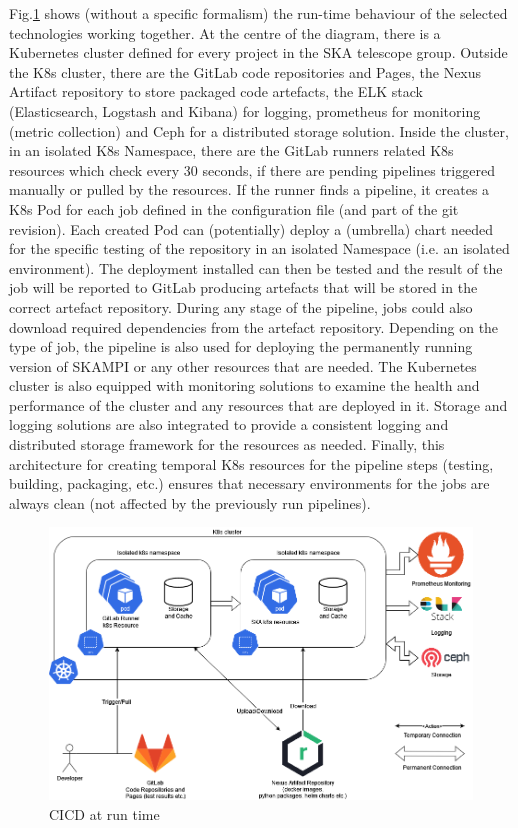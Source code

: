 \documentclass[a4paper,
               keeplastbox,   %
               ]{jacow}
\begin{document}
Fig.\ref{fig:cicdruntime} shows (without a specific formalism) the run-time behaviour of the selected technologies working together. At the centre of the diagram, there is a Kubernetes cluster defined for every project in the SKA telescope group. Outside the K8s cluster, there are the GitLab code repositories and Pages\cite{gitlab}, the Nexus Artifact repository\cite{nexus} to store packaged code artefacts, the ELK stack (Elasticsearch, Logstash and Kibana)\cite{elastcsearch} for logging, prometheus\cite{prometheus} for monitoring (metric collection) and Ceph\cite{ceph} for a distributed storage solution.
Inside the cluster, in an isolated K8s Namespace, there are the GitLab runners related K8s resources which check every 30 seconds, if there are pending pipelines triggered manually or pulled by the resources. If the runner finds a pipeline, it creates a K8s Pod for each job defined in the configuration file (and part of the git revision). Each created Pod can (potentially) deploy a (umbrella) chart needed for the specific testing of the repository in an isolated Namespace (i.e. an isolated environment). The deployment installed can then be tested and the result of the job will be reported to GitLab producing artefacts that will be stored in the correct artefact repository. During any stage of the pipeline, jobs could also download required dependencies from the artefact repository. Depending on the type of job, the pipeline is also used for deploying the permanently running version of SKAMPI or any other resources that are needed. The Kubernetes cluster is also equipped with monitoring solutions to examine the health and performance of the cluster and any resources that are deployed in it. Storage and logging solutions are also integrated to provide a consistent logging and distributed storage framework for the resources as needed. Finally, this architecture for creating temporal K8s resources for the pipeline steps (testing, building, packaging, etc.) ensures that necessary environments for the jobs are always clean (not affected by the previously run pipelines).

\begin{figure}[!htb]
   \centering
   \includegraphics*[width=0.8\columnwidth]{cicdruntime-v2}
   \caption{CICD at run time}
   \label{fig:cicdruntime}
\end{figure}
\end{document}
